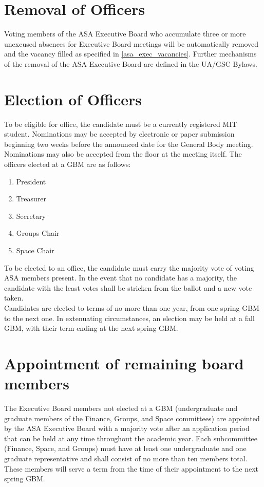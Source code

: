 \documentclass[12pt]{constitution}
\begin{document}
\section{Removal of Officers}
Voting members of the ASA Executive Board who accumulate three or more unexcused absences for Executive Board
    meetings will be automatically removed and the vacancy filled as specified in \ref{asa_exec_vacancies}.
Further mechanisms of the removal of the ASA Executive Board are defined in the UA/GSC Bylaws.

\section{Election of Officers}
\label{asa_exec_elections}
To be eligible for office, the candidate must be a currently registered MIT student.
Nominations may be accepted by electronic or paper submission beginning two weeks before the announced date for
    the General Body meeting.
Nominations may also be accepted from the floor at the meeting itself.
The officers elected at a GBM are as follows:
\begin{enumerate}
    \item President
    \item Treasurer
    \item Secretary
    \item Groups Chair
    \item Space Chair
\end{enumerate}
To be elected to an office, the candidate must carry the majority vote of voting ASA members present.
In the event that no candidate has a majority, the candidate with the least votes shall be stricken from
    the ballot and a new vote taken.
\\

Candidates are elected to terms of no more than one year, from one spring GBM to the next one.
In extenuating circumstances, an election may be held at a fall GBM, with their term ending at the next
    spring GBM.

\section{Appointment of remaining board members}
The Executive Board members not elected at a GBM (undergraduate and graduate members of the
    Finance, Groups, and Space committees) are appointed by the ASA Executive Board with a majority
    vote after an application period that can be held at any time throughout the academic year.
Each subcommittee (Finance, Space, and Groups) must have at least one undergraduate and one graduate
    representative and shall consist of no more than ten members total.
These members will serve a term from the time of their appointment to the next spring GBM.
\end{document}
